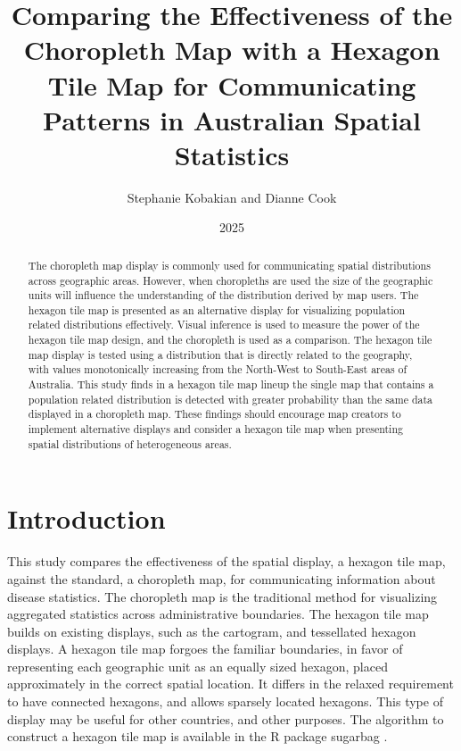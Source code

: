 \documentclass[
doublespace,
  times]{anzsauth}
\title{Comparing the Effectiveness of the Choropleth Map with a Hexagon
Tile Map for Communicating Patterns in Australian Spatial Statistics}
\author{
Stephanie Kobakian\addressnum{1} and
Dianne Cook\addressnum{2}
}
\affiliation{
Queensland University of Technology and
Monash University
}
\date{2025}
\begin{document}
\begin{abstract}
The choropleth map display is commonly used for communicating spatial
distributions across geographic areas. However, when choropleths are
used the size of the geographic units will influence the understanding
of the distribution derived by map users. The hexagon tile map is
presented as an alternative display for visualizing population related
distributions effectively. Visual inference is used to measure the power
of the hexagon tile map design, and the choropleth is used as a
comparison. The hexagon tile map display is tested using a distribution
that is directly related to the geography, with values monotonically
increasing from the North-West to South-East areas of Australia. This
study finds in a hexagon tile map lineup the single map that contains a
population related distribution is detected with greater probability
than the same data displayed in a choropleth map. These findings should
encourage map creators to implement alternative displays and consider a
hexagon tile map when presenting spatial distributions of heterogeneous
areas.
\end{abstract}

          

\maketitle


\section{Introduction}\label{sec-introduction}

This study compares the effectiveness of the spatial display, a hexagon
tile map, against the standard, a choropleth map, for communicating
information about disease statistics. The choropleth map is the
traditional method for visualizing aggregated statistics across
administrative boundaries. The hexagon tile map builds on existing
displays, such as the cartogram, and tessellated hexagon displays. A
hexagon tile map forgoes the familiar boundaries, in favor of
representing each geographic unit as an equally sized hexagon, placed
approximately in the correct spatial location. It differs in the relaxed
requirement to have connected hexagons, and allows sparsely located
hexagons. This type of display may be useful for other countries, and
other purposes. The algorithm to construct a hexagon tile map is
available in the R package sugarbag \citep{sugarbag}.
\end{document}
